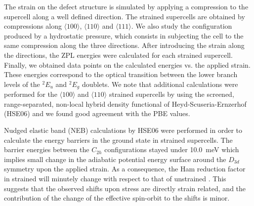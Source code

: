 	The strain on the defect structure is simulated by applying a compression to the supercell along a well defined direction. The strained supercells are obtained by compressions along $\langle 100 \rangle$, $\langle 110 \rangle$ and $\langle 111 \rangle$. We also study the configuration produced by a hydrostatic pressure, which consists in subjecting the cell to the same compression along the three directions. After introducing the strain along the directions, the ZPL energies were calculated for each strained supercell. Finally, we obtained data points on the calculated \ZPL energies vs. the applied strain. These \ZPL energies correspond to the optical transition between the lower branch levels of the ${}^{2}E_{u}$ and ${}^{2}E_{g}$ doublets. We note that additional calculations were performed for the  $\langle 100 \rangle$ and  $\langle 110 \rangle$ strained supercells by using the screened, range-separated, non-local hybrid density functional of Heyd-Scuseria-Ernzerhof (HSE06) \cite{heyd2003hybrid,krukau2006influence} and we found good agreement with the PBE values.

	Nudged elastic band (NEB) calculations \cite{henkelman2000climbing} by HSE06 were performed in order to calculate the energy barriers in the ground state in strained supercells. The barrier energies between the $C_{2h}$ configurations stayed under \SI{10.0}{\meV} which implies small change in the adiabatic potential energy surface around the $D_{3d}$ symmetry upon the applied strain. As a consequence, the Ham reduction factor in strained \siv will minutely change with respect to that of unstrained \siv \cite{thiering2018ab}. This suggests that the observed \ZPL shifts upon stress are directly strain related, and the contribution of the change of the effective spin-orbit to the \ZPL shifts is minor.

